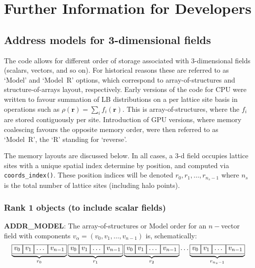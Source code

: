 %
%
%
%
%

\section{Further Information for Developers}

\subsection{Address models for 3-dimensional fields}

The code allows for different order of storage associated with 3-dimensional
fields (scalars, vectors, and so on). For historical reasons these are
referred to as `Model' and `Model~R' options, which correspond
to array-of-structures and structure-of-arrays layout, respectively. Early
versions of the code for CPU were written to favour summation of LB
distributions on a per lattice site basis in operations such as
$\rho(\mathbf{r}) = \sum_i f_i(\mathbf{r})$. This is array-of-structures,
where the $f_i$ are stored contiguously per site. Introduction of GPU
versions, where memory coalescing favours the opposite memory order,
were then referred to as `Model~R', the `R' standing for `reverse'.

The memory layouts are discussed below. In all cases, a 3-d field occupies
lattice sites with a unique spatial index determine by position, and
computed via \texttt{coords\_index()}. These position indices will be denoted
$r_0, r_1, \ldots, r_{n_s-1}$ where $n_s$ is the total number of lattice
sites (including halo points).

\subsubsection{Rank 1 objects (to include scalar fields)}
\label{subsection:addressing-model-rank1}

\textbf{ADDR\_MODEL}: The array-of-structures or Model order for an
$n-$vector field
with components $ v_\alpha = (v_0, v_1, \ldots, v_{n-1})$ is, schematically:
\[
\underbrace{ \boxed{v_0\vphantom{v_{n-1}}} \boxed{v_1\vphantom{v_{n-1}}}
\boxed{\ldots\vphantom{v_{n-1}}} \boxed{v_{n-1}} }_{r_0}
\underbrace{ \boxed{v_0\vphantom{v_{n-1}}} \boxed{v_1\vphantom{v_{n-1}}}
\boxed{\ldots\vphantom{v_{n-1}}} \boxed{v_{n-1}} }_{r_1}
\underbrace{ \boxed{v_0\vphantom{v_{n-1}}} \boxed{v_1\vphantom{v_{n-1}}}
\boxed{\ldots\vphantom{v_{n-1}}} \boxed{v_{n-1}} }_{r_2} \ldots
\underbrace{ \boxed{v_0\vphantom{v_{n-1}}} \boxed{v_1\vphantom{v_{n-1}}}
\boxed{\ldots\vphantom{v_{n-1}}} \boxed{v_{n-1}} }_{r_{n_s-1}}
\]

